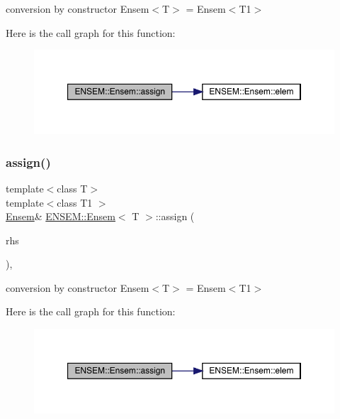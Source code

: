 conversion by constructor Ensem$<$\+T$>$ = Ensem$<$\+T1$>$ 

Here is the call graph for this function\+:
\nopagebreak
\begin{figure}[H]
\begin{center}
\leavevmode
\includegraphics[width=350pt]{d7/d3e/classENSEM_1_1Ensem_a43d968c090e5f6c518881cf7ff44d200_cgraph}
\end{center}
\end{figure}
\mbox{\label{classENSEM_1_1Ensem_a43d968c090e5f6c518881cf7ff44d200}} 
\subsubsection{\texorpdfstring{assign()}{assign()}\hspace{0.1cm}{\footnotesize\ttfamily [6/12]}}
{\footnotesize\ttfamily template$<$class T$>$ \\
template$<$class T1 $>$ \\
\mbox{\hyperlink{classENSEM_1_1Ensem}{Ensem}}\& \mbox{\hyperlink{classENSEM_1_1Ensem}{E\+N\+S\+E\+M\+::\+Ensem}}$<$ T $>$\+::assign (\begin{DoxyParamCaption}\item[{const \mbox{\hyperlink{classENSEM_1_1Ensem}{Ensem}}$<$ T1 $>$ \&}]{rhs }\end{DoxyParamCaption})\hspace{0.3cm}{\ttfamily [inline]}, {\ttfamily [protected]}}



conversion by constructor Ensem$<$\+T$>$ = Ensem$<$\+T1$>$ 

Here is the call graph for this function\+:
\nopagebreak
\begin{figure}[H]
\begin{center}
\leavevmode
\includegraphics[width=350pt]{d7/d3e/classENSEM_1_1Ensem_a43d968c090e5f6c518881cf7ff44d200_cgraph}
\end{center}
\end{figure}
\mbox{\label{classENSEM_1_1Ensem_ae31c239c3dc966eaad70ec90489f5476}} 
